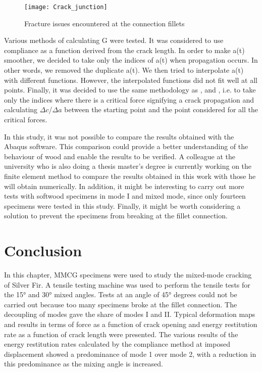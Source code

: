 \begin{figure}[htp]
	\centering
	\texttt{[image: Crack\_junction]}
	\caption{Fracture issues encountered at the connection fillets}
	\label{fig:Crack_junction}
\end{figure}

Various methods of calculating G were tested. It was considered to use compliance as a function derived from the crack length. In order to make a(t) smoother, we decided to take only the indices of a(t) when propagation occurs. In other words, we removed the duplicate a(t). We then tried to interpolate a(t) with different functions. However, the interpolated functions did not fit well at all points.
Finally, it was decided to use the same methodology as \cite{MoutouPitti2008}, \cite{Mambili2018} and  \cite{Odounga2018phd}, i.e. to take only the indices where there is a critical force signifying a crack propagation and calculating $\Delta c$/$\Delta a$ between the starting point and the point considered for all the critical forces.

In this study, it was not possible to compare the results obtained with the Abaqus software. This comparison could provide a better understanding of the behaviour of wood and enable the results to be verified. A colleague at the university who is also doing a thesis master's degree is currently working on the finite element method to compare the results obtained in this work with those he will obtain numerically. In addition, it might be interesting to carry out more tests with softwood specimens in mode I and mixed mode, since only fourteen specimens were tested in this study.
Finally, it might be worth considering a solution to prevent the specimens from breaking at the fillet connection.

\section{Conclusion}

In this chapter, MMCG specimens were used to study the mixed-mode cracking of Silver Fir. A tensile testing machine was used to perform the tensile tests for the 15° and 30° mixed angles. Tests at an angle of 45° degrees could not be carried out because too many specimens broke at the fillet connection. The decoupling of modes gave the share of modes I and II.  Typical deformation maps and results in terms of force as a function of crack opening and energy restitution rate as a function of crack length were presented. The various results of the energy restitution rates calculated by the compliance method at imposed displacement showed a predominance of mode 1 over mode 2, with a reduction in this predominance as the mixing angle is increased.